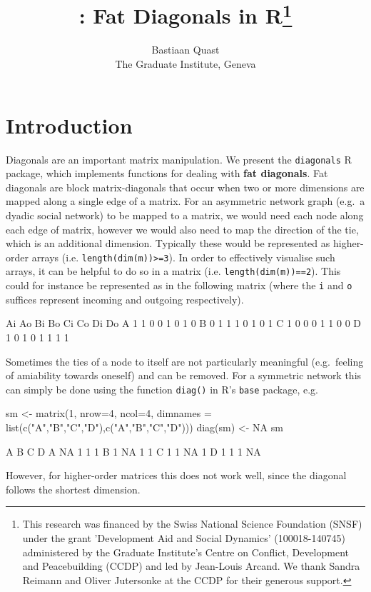 \documentclass[article]{jss}
\author{
Bastiaan Quast\\The Graduate Institute, Geneva
}
\title{\pkg{diagonals}: Fat Diagonals in
R\thanks{This research was financed by the Swiss National Science Foundation (SNSF) under the grant 'Development Aid and Social Dynamics' (100018-140745) administered by the Graduate Institute's Centre on Conflict, Development and Peacebuilding (CCDP) and led by Jean-Louis Arcand. We thank Sandra Reimann and Oliver Jutersonke at the CCDP for their generous support.}}
\begin{document}
\section{Introduction}\label{introduction}

Diagonals are an important matrix manipulation. We present the
\texttt{diagonals} R package, which implements functions for dealing
with \textbf{fat diagonals}. Fat diagonals are block matrix-diagonals
that occur when two or more dimensions are mapped along a single edge of
a matrix. For an asymmetric network graph (e.g.~a dyadic social network)
to be mapped to a matrix, we would need each node along each edge of
matrix, however we would also need to map the direction of the tie,
which is an additional dimension. Typically these would be represented
as higher-order arrays (i.e. \texttt{length(dim(m))\textgreater{}=3}).
In order to effectively visualise such arrays, it can be helpful to do
so in a matrix (i.e. \texttt{length(dim(m))==2}). This could for
instance be represented as in the following matrix (where the \texttt{i}
and \texttt{o} suffices represent incoming and outgoing respectively).

\begin{CodeChunk}
\begin{CodeOutput}
  Ai Ao Bi Bo Ci Co Di Do
A  1  1  0  0  1  0  1  0
B  0  1  1  1  0  1  0  1
C  1  0  0  0  1  1  0  0
D  1  0  1  0  1  1  1  1
\end{CodeOutput}
\end{CodeChunk}

Sometimes the ties of a node to itself are not particularly meaningful
(e.g.~feeling of amiability towards oneself) and can be removed. For a
symmetric network this can simply be done using the function
\texttt{diag()} in R's \texttt{base} package, e.g.

\begin{CodeChunk}
\begin{CodeInput}
sm <- matrix(1, nrow=4, ncol=4,
             dimnames = list(c("A","B","C","D"),c("A","B","C","D")))
diag(sm) <- NA
sm
\end{CodeInput}
\begin{CodeOutput}
   A  B  C  D
A NA  1  1  1
B  1 NA  1  1
C  1  1 NA  1
D  1  1  1 NA
\end{CodeOutput}
\end{CodeChunk}

However, for higher-order matrices this does not work well, since the
diagonal follows the shortest dimension.
\end{document}
